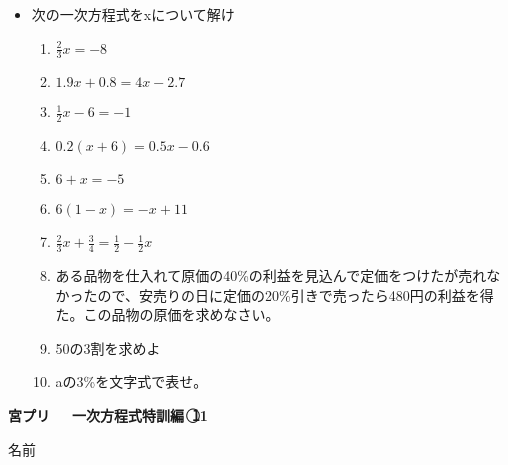 \documentclass[a4paper,fleqn,papersize,15pt]{jsarticle}
\begin{document}
 \begin{itemize}
   \item 次の一次方程式をxについて解け
   \begin{enumerate}
\item $\frac{2}{3} x = -8$ \begin{flushright}\framebox[8em]{\rule{0pt}{6ex}}\end{flushright} %
\item $1.9x+0.8=4x-2.7$ \begin{flushright}\framebox[8em]{\rule{0pt}{6ex}}\end{flushright} %
\item $\frac{1}{2} x-6=-1$ \begin{flushright}\framebox[8em]{\rule{0pt}{6ex}}\end{flushright} %
\item $0.2(x+6)=0.5x-0.6$ \begin{flushright}\framebox[8em]{\rule{0pt}{6ex}}\end{flushright} %
\item $6+x=-5$ \begin{flushright}\framebox[8em]{\rule{0pt}{6ex}}\end{flushright} %
\item $6(1-x)=-x+11$ \begin{flushright}\framebox[8em]{\rule{0pt}{6ex}}\end{flushright} %
\item $\frac{2}{3} x+ \frac{3}{4} = \frac{1}{2} - \frac{1}{2}x$ \begin{flushright}\framebox[8em]{\rule{0pt}{6ex}}\end{flushright} %
\item ある品物を仕入れて原価の40\%の利益を見込んで定価をつけたが売れなかったので、安売りの日に定価の20\%引きで売ったら480円の利益を得た。この品物の原価を求めなさい。 \vfill \begin{flushright}\framebox[8em]{\rule{0pt}{6ex}}\end{flushright} %
\item 50の3割を求めよ \vfill \begin{flushright}\framebox[8em]{\rule{0pt}{6ex}}\end{flushright} %
\item aの3\%を文字式で表せ。 \vfill \begin{flushright}\framebox[8em]{\rule{0pt}{6ex}}\end{flushright} %
\end{enumerate}
    \vfill
\end{itemize}
\clearpage
 \begin{center}
   \LARGE\textbf{宮プリ　~一次方程式特訓編~\textcircled{\scriptsize 11}}
     \begin{flushright}
       名前\underline{\hspace{8zw}}
     \end{flushright}
 \end{center}
\end{document}
